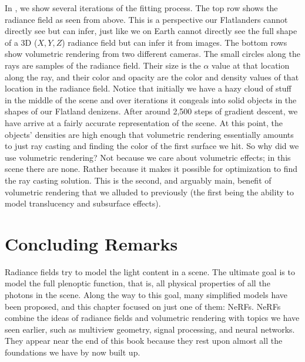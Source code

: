 In \Fig{\ref{fig:nerfs:flatland_training}}, we show several iterations of the fitting process. The top row shows the radiance field as seen from above. This is a perspective our Flatlanders cannot directly see but can infer, just like we on Earth cannot directly see the full shape of a 3D ($X,Y,Z$) radiance field but can infer it from images. The bottom rows show volumetric rendering from two different cameras. The small circles along the rays are samples of the radiance field. Their size is the $\alpha$ value at that location along the ray, and their color and opacity are the color and density values of that location in the radiance field. Notice that initially we have a hazy cloud of stuff in the middle of the scene and over iterations it congeals into solid objects in the shapes of our Flatland denizens. After around 2,500 steps of gradient descent, we have arrive at a fairly accurate representation of the scene. At this point, the objects' densities are high enough that volumetric rendering essentially amounts to just ray casting and finding the color of the first surface we hit. So why did we use volumetric rendering? Not because we care about volumetric effects; in this scene there are none. Rather because it makes it possible for optimization to find the ray casting solution. This is the second, and arguably main, benefit of volumetric rendering that we alluded to previously (the first being the ability to model translucency and subsurface effects).





\section{Concluding Remarks}

Radiance fields try to model the light content in a scene. The ultimate goal is to model the full plenoptic function, that is, all physical properties of all the photons in the scene. Along the way to this goal, many simplified models have been proposed, and this chapter focused on just one of them: NeRFs. NeRFs combine the ideas of radiance fields and volumetric rendering with topics we have seen earlier, such as multiview geometry, signal processing, and neural networks. They appear near the end of this book because they rest upon almost all the foundations we have by now built up.




